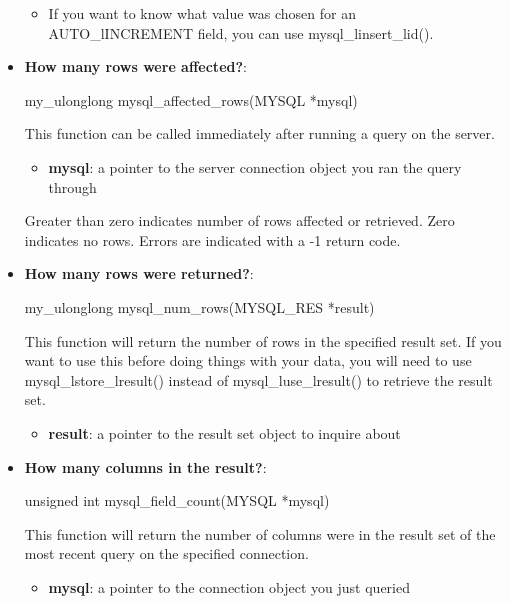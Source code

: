 \documentclass{report}
\begin{document}
\begin{itemize}
\begin{itemize}
                \item If you want to know what value was chosen for an AUTO\_lINCREMENT field, you can use mysql\_linsert\_lid().
            \end{itemize}
        \item \textbf{How many rows were affected?}:
            \bigbreak \noindent 
            \begin{cppcode}
                my_ulonglong mysql_affected_rows(MYSQL *mysql)
            \end{cppcode}
            \bigbreak \noindent 
            This function can be called immediately after running a query on the server.
            \begin{itemize}
                \item \textbf{mysql}: a pointer to the server connection object you ran the query through
            \end{itemize}
            \bigbreak \noindent 
            Greater than zero indicates number of rows affected or retrieved. Zero indicates no rows. Errors are indicated with a -1 return code.
        \item \textbf{How many rows were returned?}:
            \bigbreak \noindent 
            \begin{cppcode}
                my_ulonglong mysql_num_rows(MYSQL_RES *result)
            \end{cppcode}
            \bigbreak \noindent 
            This function will return the number of rows in the specified result set. If you want to use this before doing things with your data, you will need to use mysql\_lstore\_lresult() instead of mysql\_luse\_lresult() to retrieve the result set.
            \begin{itemize}
                \item \textbf{result}: a pointer to the result set object to inquire about
            \end{itemize}
        \item \textbf{How many columns in the result?}:
            \bigbreak \noindent 
            \begin{cppcode}
                unsigned int mysql_field_count(MYSQL *mysql)
            \end{cppcode}
            \bigbreak \noindent 
            This function will return the number of columns were in the result set of the most recent query on the specified connection.
            \begin{itemize}
                \item \textbf{mysql}: a pointer to the connection object you just queried

\end{itemize}
\end{itemize}
\end{document}
